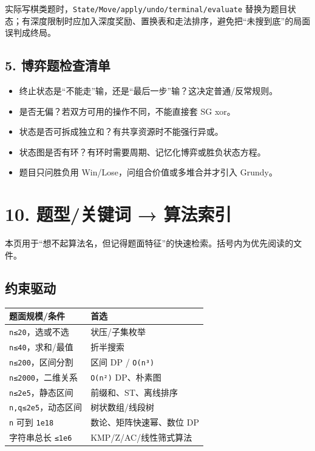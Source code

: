 实际写棋类题时，\passthrough{\lstinline!State/Move/apply/undo/terminal/evaluate!} 替换为题目状态；有深度限制时应加入深度奖励、置换表和走法排序，避免把``未搜到底''的局面误判成终局。

\section{5. 博弈题检查清单}\label{ux535aux5f08ux9898ux68c0ux67e5ux6e05ux5355}

\begin{itemize}
\tightlist
\item
  终止状态是``不能走''输，还是``最后一步''输？这决定普通/反常规则。
\item
  是否无偏？若双方可用的操作不同，不能直接套 SG xor。
\item
  状态是否可拆成独立和？有共享资源时不能强行异或。
\item
  状态图是否有环？有环时需要周期、记忆化博弈或胜负状态方程。
\item
  题目只问胜负用 Win/Lose，问组合价值或多堆合并才引入 Grundy。
\end{itemize}

\chapter{10. 题型/关键词 → 算法索引}\label{ux9898ux578bux5173ux952eux8bcd-ux7b97ux6cd5ux7d22ux5f15}

本页用于``想不起算法名，但记得题面特征''的快速检索。括号内为优先阅读的文件。

\section{约束驱动}\label{ux7ea6ux675fux9a71ux52a8}

\begin{longtable}[]{@{}ll@{}}
\toprule\noalign{}
题面规模/条件 & 首选 \\
\midrule\noalign{}
\endhead
\bottomrule\noalign{}
\endlastfoot
\passthrough{\lstinline!n≤20!}，选或不选 & 状压/子集枚举 \\
\passthrough{\lstinline!n≤40!}，求和/最值 & 折半搜索 \\
\passthrough{\lstinline!n≤200!}，区间分割 & 区间 DP / \passthrough{\lstinline!O(n³)!} \\
\passthrough{\lstinline!n≤2000!}，二维关系 & \passthrough{\lstinline!O(n²)!} DP、朴素图 \\
\passthrough{\lstinline!n≤2e5!}，静态区间 & 前缀和、ST、离线排序 \\
\passthrough{\lstinline!n,q≤2e5!}，动态区间 & 树状数组/线段树 \\
\passthrough{\lstinline!n!} 可到 \passthrough{\lstinline!1e18!} & 数论、矩阵快速幂、数位 DP \\
字符串总长 \passthrough{\lstinline!≤1e6!} & KMP/Z/AC/线性筛式算法 \\
\end{longtable}

